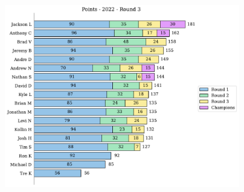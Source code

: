 \documentclass[10pt]{article}
\begin{document}
%
\begin{minipage}[t]{13cm}
    \vspace{0pt}
    \begin{figure}[H]
        \vspace{-1cm}
        \includegraphics[width=12cm,height=8cm,keepaspectratio]{../../figures/2022/Points-2022-Round3.pdf}
    \end{figure}
\end{minipage}
\end{document}
